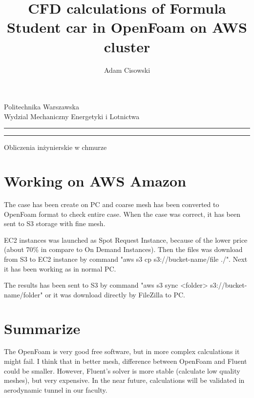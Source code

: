 \documentclass[11pt,oneside,titlepage]{report}
\author{Adam Cisowski}
\title{CFD calculations of Formula Student car in OpenFoam on AWS cluster}
\makeatletter
\newcommand{\linia}{\rule{\linewidth}{0.4mm}}
\renewcommand{\maketitle}{\begin{titlepage}
    \vspace*{0cm}
    \begin{center}
    Politechnika Warszawska\\
    Wydzial Mechaniczny Energetyki i Lotnictwa\\
    
    
    \end{center}
    \vspace{3cm}
    \noindent\linia
    \begin{center}
      \LARGE \textsc{\@title}
         \end{center}
     \linia
	\vspace{1cm}     
     \begin{center}\large
     Obliczenia inżynierskie w chmurze
     \end{center}
    \vspace{2cm}
   
    \begin{center}\Large 
    \@author
    
    \end{center}
    \vspace{9cm}
    \begin{center}
    \@date
    \end{center}
  \end{titlepage}%
}
\makeatother
\begin{document}
\pagestyle{fancy}
\lhead{}

\maketitle
\tableofcontents
\newpage




 













\newpage
{}
\section{Working on AWS Amazon}

The case has been create on PC and coarse mesh has been converted to OpenFoam format to check entire case. When the case was correct, it has been sent to S3 storage with fine mesh. 

EC2 instances was launched as Spot Request Instance, because of the lower price (about 70\% in compare to On Demand Instances). Then the files was download from S3 to EC2 instance by command "aws s3 cp s3://bucket-name/file ./". Next it has been working as in normal PC. 

The results has been sent to S3 by command "aws s3 sync <folder> s3://bucket-name/folder" or it was download directly by FileZilla to PC.

\section{Summarize}
The OpenFoam is very good free software, but in more complex calculations it might fail. I think that in better mesh, difference between OpenFoam and Fluent could be smaller. However, Fluent's solver is more stable (calculate low quality meshes), but very expensive. In the near future, calculations will be validated in aerodynamic tunnel in our faculty.
\end{document}
